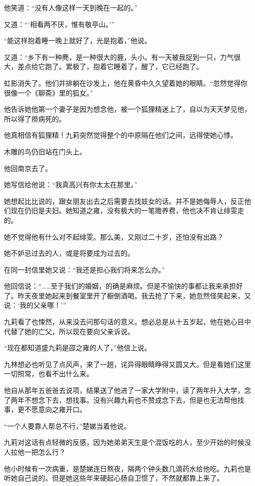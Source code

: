 \par 他笑道：“没有人像这样一天到晚在一起的。”
\par 又道：“‘相看两不厌，惟有敬亭山。'”
\par “能这样抱着睡一晚上就好了，光是抱着，”他说。
\par 又道：“乡下有一种麂，是一种很大的鹿，头小。有一天被我捉到一只，力气很大，差点给它跑了。累极了，抱着它睡着了，醒了，它已经跑了。
\par 虹影消失了。他们并排躺在沙发上，他在黄昏中久久望着她的眼睛。“忽然觉得你很像一个《聊斋》里的狐女。”
\par 他告诉她他第一个妻子是因为想念他，被一个狐狸精迷上了，自以为天天梦见他，所以得了痨病死的。
\par 他真相信有狐狸精！九莉突然觉得整个的中原隔在他们之间，远得使她心悸。
\par 木雕的鸟仍旧站在门头上。
\par 他回南京去了。
\par 她写信给他说：“我真高兴有你太太在那里。”
\par 她想起比比说的，跟女朋友出去之后需要去找妓女的话。并不是她侮辱人，反正他们现在仍旧是夫妇。她知道之雍，没有极大的一笔赡养费，他也决不肯让绯雯走的。
\par 她不觉得他有什么对不起绯雯。那么美，又刚过二十岁，还怕没有出路？
\par 她不妒忌过去的人，或是将要成为过去的。
\par 在同一封信里她又说：“我还是担心我们将来怎么办。”
\par 他回信说：“……至于我们的婚姻，的确是麻烦。但是不愉快的事都让我来承担好了。昨天夜里她起来到餐室里开了橱倒酒喝。我去抢了下来，她忽然怪笑起来，又说：‘我的父亲哪！'”
\par 九莉看了也悚然，从来没去问那句话的意义。想必总是从十五岁起，他在她心目中代替了她的亡父，所以现在要向父亲诉说。
\par “现在都知道盛九莉是邵之雍的人了，”他信上说。
\par 九林想必也听见了点风声，来了一趟，诧异得眼睛睁得又圆又大。但是看她们这里一切照常，也看不出什么来。
\par 他自从那年五爸爸去说项，结果送了他进了一家大学附中，读了两年升入大学，念了两年不想念下去，想找事。没有兴趣九莉也不赞成念下去，但是也无法帮他找事，更不愿意向之雍开口。
\par “一个人要靠人帮总不行，”楚娣当着他说。
\par 九莉对这话有点轻微的反感，因为她弟弟天生是个混饭吃的人，至少开始的时候没人拉他一把怎么行？
\par 他小时候有一次病重，是楚娣连日熬夜，隔两个钟头数几滴药水给他吃。九莉也是听她自己说的。但是她这些年来硬起心肠自卫惯了，不然就都靠上来了。
